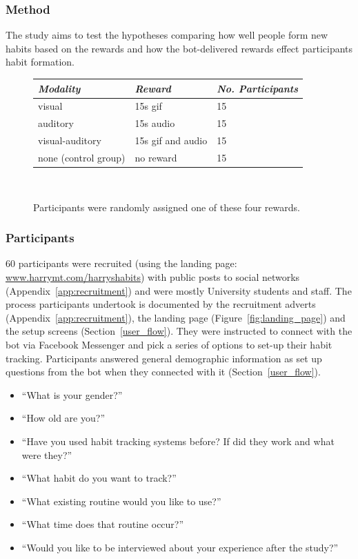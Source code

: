 \subsubsection{Method}
The study aims to test the hypotheses comparing how well people form new habits based on the rewards and how the bot-delivered rewards effect participants habit formation.

\begin{figure}[H]
  \centering
  \begin{tabular}{l l l}
    {\small\textit{Modality}} & {\small \textit{Reward}} & {\small \textit{No. Participants}}  \\ \hline
    visual & 15s gif & 15 \\
    auditory & 15s audio & 15 \\
    visual-auditory & 15s gif and audio & 15 \\
    none (control group) & no reward & 15 \\
  \end{tabular}
  \caption{Participants were randomly assigned one of these four rewards.}~\label{fig:precise_rewards}
\end{figure}

\subsubsection{Participants}
60 participants were recruited (using the landing page: \url{www.harrymt.com/harryshabits}) with public posts to social networks (Appendix~\ref{app:recruitment}) and were mostly University students and staff. The process participants undertook is documented by the recruitment adverts (Appendix~\ref{app:recruitment}), the landing page (Figure~\ref{fig:landing_page}) and the setup screens (Section~\ref{user_flow}). They were instructed to connect with the bot via Facebook Messenger and pick a series of options to set-up their habit tracking. Participants answered general demographic information as set up questions from the bot when they connected with it (Section~\ref{user_flow}).

\begin{itemize}
  \item ``What is your gender?''
    \item ``How old are you?''
    \item ``Have you used habit tracking systems before? If did they work and what were they?''
    \item ``What habit do you want to track?''
    \item ``What existing routine would you like to use?''
    \item ``What time does that routine occur?''
    \item ``Would you like to be interviewed about your experience after the study?''
\end{itemize}


